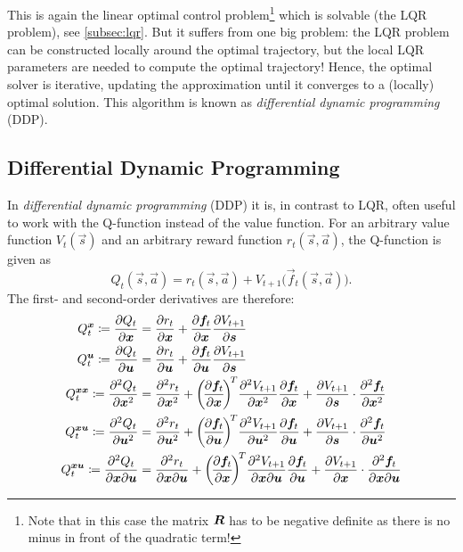 		This is again the linear optimal control problem\footnote{Note that in this case the matrix \(\bm{R}\) has to be negative definite as there is no minus in front of the quadratic term!} which is solvable (the LQR problem), see \autoref{subsec:lqr}. But it suffers from one big problem: the LQR problem can be constructed locally around the optimal trajectory, but the local LQR parameters are needed to compute the optimal trajectory! Hence, the optimal solver is iterative, updating the approximation until it converges to a (locally) optimal solution. This algorithm is known as \emph{differential dynamic programming} (DDP).

		\subsection{Differential Dynamic Programming}
			In \emph{differential dynamic programming} (DDP) it is, in contrast to LQR, often useful to work with the Q-function instead of the value function. For an arbitrary value function \( V_t(\vec{s}) \) and an arbitrary reward function \( r_t(\vec{s}, \vec{a}) \), the Q-function is given as
			\begin{equation*}
				Q_t(\vec{s}, \vec{a}) = r_t(\vec{s}, \vec{a}) + V_{t + 1}\big(\vec{f}_t(\vec{s}, \vec{a})\big).
			\end{equation*}
			The first- and second-order derivatives are therefore:
			\begin{equation}
				\begin{aligned}
					Q_t^{\vec{x}} \coloneqq \pdv{Q_t}{\vec{x}}                  & = \pdv{r_t}{\vec{x}} + \pdv{\vec{f}_t}{\vec{x}} \pdv{V_{t + 1}}{\vec{s}}                                                                                                                                       \\
					Q_t^{\vec{u}} \coloneqq \pdv{Q_t}{\vec{u}}                  & = \pdv{r_t}{\vec{u}} + \pdv{\vec{f}_t}{\vec{u}} \pdv{V_{t + 1}}{\vec{s}}                                                                                                                                       \\
					Q_t^{\vec{x} \vec{x}} \coloneqq \pdv[2]{Q_t}{\vec{x}}       & = \pdv[2]{r_t}{\vec{x}} + \bigg(\! \pdv{\vec{f}_t}{\vec{x}} \!\bigg)^{\!T} \pdv[2]{V_{t + 1}}{\vec{x}} \pdv{\vec{f}_t}{\vec{x}} + \pdv{V_{t + 1}}{\vec{s}} \cdot \pdv[2]{\vec{f}_t}{\vec{x}}                   \\
					Q_t^{\vec{x} \vec{u}} \coloneqq \pdv[2]{Q_t}{\vec{u}}       & = \pdv[2]{r_t}{\vec{u}} + \bigg(\! \pdv{\vec{f}_t}{\vec{u}} \!\bigg)^{\!T} \pdv[2]{V_{t + 1}}{\vec{u}} \pdv{\vec{f}_t}{\vec{u}} + \pdv{V_{t + 1}}{\vec{s}} \cdot \pdv[2]{\vec{f}_t}{\vec{u}}                   \\
					Q_t^{\vec{x} \vec{u}} \coloneqq \pdv{Q_t}{\vec{x}}{\vec{u}} & = \pdv{r_t}{\vec{x}}{\vec{u}} + \bigg(\! \pdv{\vec{f}_t}{\vec{x}} \!\bigg)^{\!T} \pdv{V_{t + 1}}{\vec{x}}{\vec{u}} \pdv{\vec{f}_t}{\vec{u}} + \pdv{V_{t + 1}}{\vec{x}} \cdot \pdv{\vec{f}_t}{\vec{x}}{\vec{u}}
				\end{aligned}  \label{eq:ddpDerivatives}
			\end{equation}
